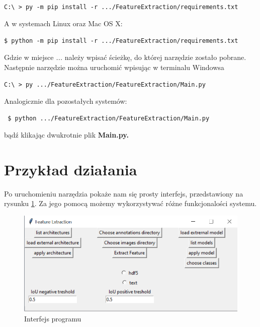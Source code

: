 \documentclass[a4paper,twoside,12pt]{book}
\begin{document}
{{\lstinline|C:\ > py -m pip install -r .../FeatureExtraction/requirements.txt| }

{A w systemach Linux oraz Mac OS X:}


{\lstinline|$ python -m pip install -r .../FeatureExtraction/requirements.txt| }

{Gdzie w miejsce \emph{...} należy wpisać ścieżkę, do której narzędzie zostało pobrane. Następnie narzędzie można uruchomić wpisując w terminalu Windowsa}

{\lstinline|C:\ > py .../FeatureExtraction/FeatureExtraction/Main.py| }

{Analogicznie dla pozostałych systemów:}

{\lstinline| $ python .../FeatureExtraction/FeatureExtraction/Main.py| }

{bądź klikając dwukrotnie plik \textbf{Main.py.}}
\section{Przykład działania}
{Po uruchomieniu narzędzia pokaże nam się prosty interfejs, przedstawiony na rysunku \ref{interface}. Za jego pomocą możemy wykorzystywać różne funkcjonalości systemu.}


\begin{figure}[h!]


\centering
\includegraphics[scale=0.9]{interface.png}
\caption{Interfejs programu}
\label{interface}
\end{figure}

}
\end{document}
